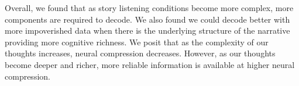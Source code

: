 Overall, we found that as story listening conditions become more complex, more components are required to decode. We also found we could decode better with more impoverished data when
there is the underlying structure of the narrative providing more cognitive richness. We posit that as the complexity of our thoughts increases, neural compression decreases. However, as our thoughts become deeper and richer, more reliable information is available at higher neural compression.





  
  
  
  




 



